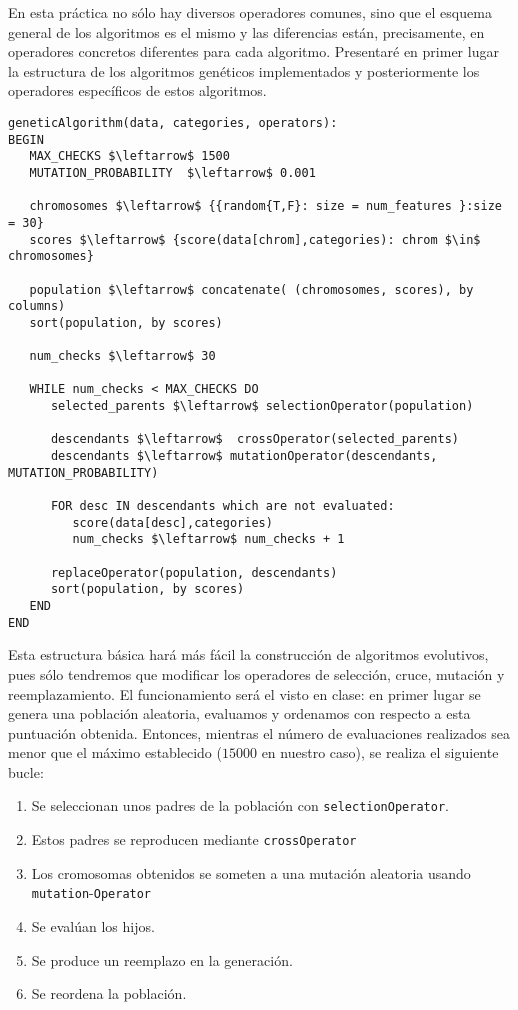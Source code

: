\documentclass[11pt,leqno]{article}
\begin{document}
En esta práctica no sólo hay diversos operadores comunes, sino que el esquema general de los algoritmos es el mismo y las diferencias están, precisamente, en operadores concretos diferentes para cada algoritmo. Presentaré en primer lugar la estructura de los algoritmos genéticos implementados y posteriormente los operadores específicos de estos algoritmos.
	
\begin{lstlisting}[mathescape=true]
geneticAlgorithm(data, categories, operators):
BEGIN
   MAX_CHECKS $\leftarrow$ 1500
   MUTATION_PROBABILITY  $\leftarrow$ 0.001
   
   chromosomes $\leftarrow$ {{random{T,F}: size = num_features }:size = 30}
   scores $\leftarrow$ {score(data[chrom],categories): chrom $\in$ chromosomes} 
   
   population $\leftarrow$ concatenate( (chromosomes, scores), by columns)
   sort(population, by scores)
   
   num_checks $\leftarrow$ 30
   
   WHILE num_checks < MAX_CHECKS DO
      selected_parents $\leftarrow$ selectionOperator(population)
      
      descendants $\leftarrow$  crossOperator(selected_parents)
      descendants $\leftarrow$ mutationOperator(descendants, MUTATION_PROBABILITY)
                                                      
      FOR desc IN descendants which are not evaluated:
         score(data[desc],categories)
         num_checks $\leftarrow$ num_checks + 1
                            
      replaceOperator(population, descendants)
      sort(population, by scores)
   END
END
\end{lstlisting}	

	Esta estructura básica hará más fácil la construcción de algoritmos evolutivos, pues sólo tendremos que modificar los operadores de selección, cruce, mutación y reemplazamiento. El funcionamiento será el visto en clase: en primer lugar se genera una población aleatoria, evaluamos y ordenamos con respecto a esta puntuación obtenida. Entonces, mientras el número de evaluaciones realizados sea menor que el máximo establecido ($15000$ en nuestro caso), se realiza el siguiente bucle:
	
\begin{enumerate}[i]
\item Se seleccionan unos padres de la población con \texttt{selectionOperator}.
\item Estos padres se reproducen mediante \texttt{crossOperator}
\item Los cromosomas obtenidos se someten a una mutación aleatoria usando \texttt{mutation}-\texttt{Operator}
\item Se evalúan los hijos.
\item Se produce un reemplazo en la generación.
\item Se reordena la población.
\end{enumerate}
\end{document}
